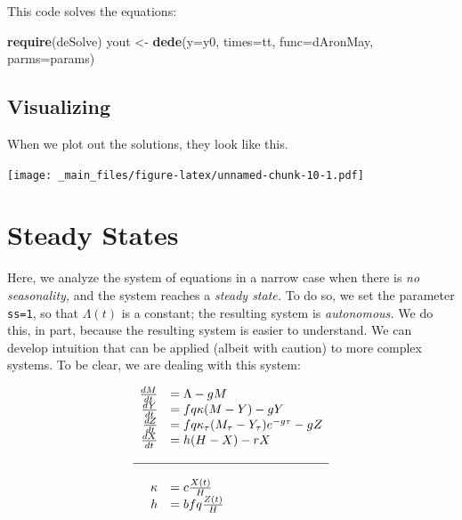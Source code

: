 \documentclass[
]{book}
\newenvironment{Shaded}{\begin{snugshade}}{\end{snugshade}}
\newcommand{\AttributeTok}[1]{\textcolor[rgb]{0.13,0.29,0.53}{#1}}
\newcommand{\FunctionTok}[1]{\textcolor[rgb]{0.13,0.29,0.53}{\textbf{#1}}}
\newcommand{\NormalTok}[1]{#1}
\newcommand{\OtherTok}[1]{\textcolor[rgb]{0.56,0.35,0.01}{#1}}
\begin{document}
This code solves the equations:

\begin{Shaded}
\begin{Highlighting}[]
\FunctionTok{require}\NormalTok{(deSolve)}
\NormalTok{yout }\OtherTok{\textless{}{-}} \FunctionTok{dede}\NormalTok{(}\AttributeTok{y=}\NormalTok{y0, }\AttributeTok{times=}\NormalTok{tt, }\AttributeTok{func=}\NormalTok{dAronMay, }\AttributeTok{parms=}\NormalTok{params) }
\end{Highlighting}
\end{Shaded}

\hypertarget{visualizing}{%
\subsection{Visualizing}\label{visualizing}}

When we plot out the solutions, they look like this.

\texttt{[image: \_main\_files/figure-latex/unnamed-chunk-10-1.pdf]}

\clearpage

\hypertarget{steady-states}{%
\section{Steady States}\label{steady-states}}

Here, we analyze the system of equations in a narrow case when there is \emph{no seasonality,} and the system reaches a \emph{steady state.} To do so, we set the parameter \texttt{ss=1}, so that \(\Lambda(t)\) is a constant; the resulting system is \emph{autonomous.} We do this, in part, because the resulting system is easier to understand. We can develop intuition that can be applied (albeit with caution) to more complex systems. To be clear, we are dealing with this system:

\begin{equation}
\begin{array}{rl}
\frac{dM}{dt} &= \Lambda - g M \\
\frac{dY}{dt} &= fq\kappa(M-Y) - g Y \\
\frac{dZ}{dt} &= fq\kappa_\tau(M_\tau-Y_\tau)e^{-g\tau} - g Z \\
\frac{dX}{dt} &= h (H-X) - rX  \\ \\ \hline \\ 
\kappa &= c \frac{X(t)}{H} \\
h &= b fq \frac{Z(t)}{H} \\
\end{array}
\end{equation}
\end{document}
